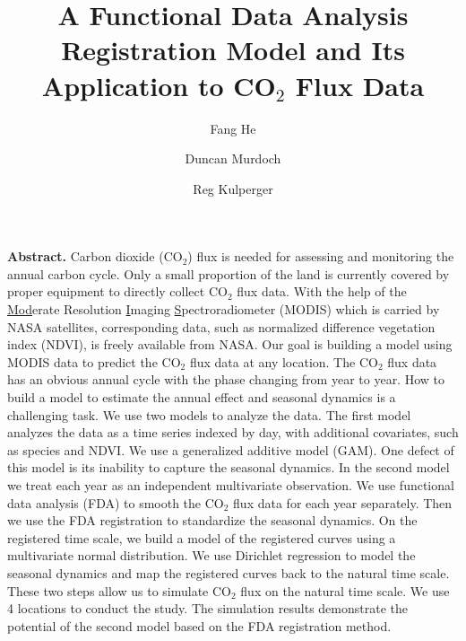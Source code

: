\documentclass{article}\usepackage[]{graphicx}\usepackage[]{color}
\begin{document}

\title{A Functional Data Analysis Registration Model and Its Application to CO$_2$ Flux Data}

\author[1]{Fang He}
\author[2]{Duncan Murdoch}
\author[2]{Reg Kulperger}
 
\maketitle


\textbf{Abstract.}  Carbon dioxide (CO$_2$) flux is needed for assessing and monitoring the annual carbon cycle. Only a small proportion of the land is currently covered by proper equipment to directly collect CO$_2$ flux data. With the help of the \underline{Mod}erate Resolution \underline{I}maging \underline{S}pectroradiometer (MODIS) which is carried by NASA satellites, corresponding data, such as normalized difference vegetation index (NDVI), is freely available from NASA. Our goal is building a model using MODIS data to predict the CO$_2$ flux data at any location. The CO$_2$ flux data has an obvious annual cycle with the phase changing from year to year. How to build a model to estimate the annual effect and seasonal dynamics is a challenging task. We use two models to analyze the data. The first model analyzes the data as a time series indexed by day, with additional covariates, such as species and NDVI. We use a  generalized additive model (GAM). One defect of this model is its inability to capture the seasonal dynamics. In the second model we treat each year as an independent multivariate observation. We use functional data analysis (FDA) to smooth the CO$_2$ flux data for each year separately. Then we use the FDA registration to standardize the seasonal dynamics. On the registered time scale, we build a model of the registered curves using a multivariate normal distribution. We use Dirichlet regression to model the seasonal dynamics and map the registered curves back to the natural time scale. These two steps allow us to simulate CO$_2$ flux on the natural time scale. We use 4 locations to conduct the study. The simulation results demonstrate the potential of the second model based on the FDA registration method.

\citep{marsrover}

\newpage

\tableofcontents

\newpage
 
\end{document}
